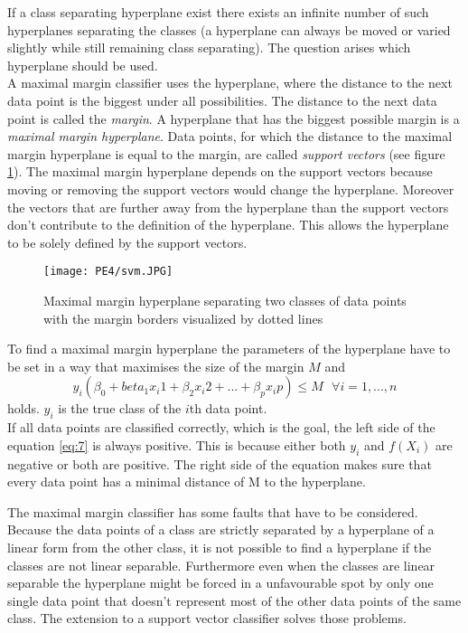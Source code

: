 If a class separating hyperplane exist there exists an infinite number of such hyperplanes separating the classes (a hyperplane can always be moved or varied slightly while still remaining class separating). The question arises which hyperplane should be used. 
\\
A maximal margin classifier uses the hyperplane, where the distance to the next data point  is the biggest under all possibilities. The distance to the next data point is called the \emph{margin}. A hyperplane that has the biggest possible margin is a \emph{maximal margin hyperplane}. Data points, for which the distance to the maximal margin hyperplane is equal to the margin, are called \emph{support vectors} (see figure \ref{fig:mmh}). The maximal margin hyperplane depends on the support vectors because moving or removing the support vectors would change the hyperplane. Moreover the vectors that are further away from the hyperplane than the support vectors don't contribute to the definition of the hyperplane. This allows the hyperplane to be solely defined by the support vectors.\\

\begin{figure}[h]
\centering
\texttt{[image: PE4/svm.JPG]}
\caption{Maximal margin hyperplane separating two classes of data points with the margin borders visualized by dotted lines}
\label{fig:mmh}
\end{figure}

To find a maximal margin hyperplane the parameters of the hyperplane have to be set in a way that maximises the size of the margin $M$ and
\begin{equation} \label{eq:7}
y_i(\beta_0+beta_1 x_i1 +\beta_2 x_i2 + ... +\beta_p x_ip) \leq M \text{     }  \forall i=1,...,n
\end{equation}
holds.
$y_i$ is the true class of the $i$th data point. 
\\
If all data points are classified correctly, which is the goal, the left side of the equation \ref{eq:7} is always positive. This is because either both $y_i$ and $f(X_i)$ are negative or both are positive. The right side of the equation makes sure that every data point has a minimal distance of M to the hyperplane.

The maximal margin classifier has some faults that have to be considered. Because the data points of a class are strictly separated by a hyperplane of a linear form from the other class, it is not possible to find a hyperplane if the classes are not linear separable.  Furthermore even when the classes are linear separable the hyperplane might be forced in a unfavourable spot by only one single data point that doesn't represent most of the other data points of the same class. The extension to a support vector classifier solves those problems.

